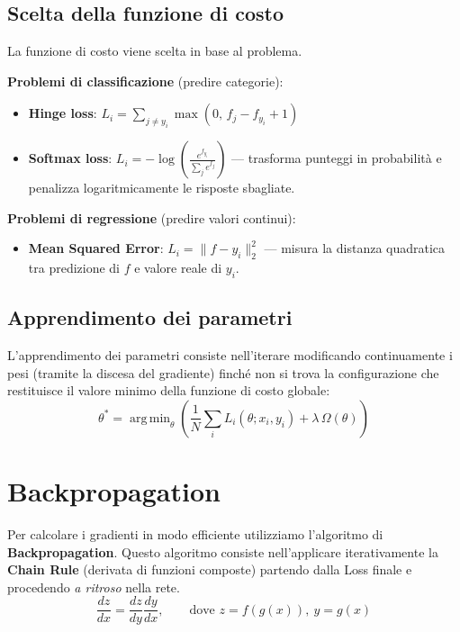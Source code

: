 \documentclass[11pt,a4paper]{article}
\DeclareMathOperator*{\argmin}{arg\,min}
\begin{document}
\subsection{Scelta della funzione di costo}
La funzione di costo viene scelta in base al problema.

\textbf{Problemi di classificazione} (predire categorie):
\begin{itemize}
  \item \textbf{Hinge loss}: $\displaystyle L_i = \sum_{j\neq y_i}\max(0,\, f_j - f_{y_i} + 1)$
  \item \textbf{Softmax loss}: $\displaystyle L_i = -\log\!\left(\frac{e^{f_{y_i}}}{\sum_j e^{f_j}}\right)$ \;— trasforma punteggi in probabilità e penalizza logaritmicamente le risposte sbagliate.
\end{itemize}

\textbf{Problemi di regressione} (predire valori continui):
\begin{itemize}
  \item \textbf{Mean Squared Error}: $L_i = \|f - y_i\|_2^2$ \;— misura la distanza quadratica tra predizione di $f$ e valore reale di $y_i$.
\end{itemize}

\subsection{Apprendimento dei parametri}
L'apprendimento dei parametri consiste nell'iterare modificando continuamente i pesi (tramite la discesa del gradiente) finché non si trova la configurazione che restituisce il valore minimo della funzione di costo globale:
\[
\theta^* = \argmin_\theta\left(\frac{1}{N}\sum_i L_i(\theta; x_i, y_i) + \lambda\,\Omega(\theta)\right)
\]

\section{Backpropagation}

Per calcolare i gradienti in modo efficiente utilizziamo l'algoritmo di \textbf{Backpropagation}. Questo algoritmo consiste nell'applicare iterativamente la \textbf{Chain Rule} (derivata di funzioni composte) partendo dalla Loss finale e procedendo \emph{a ritroso} nella rete.
\[
\frac{dz}{dx} = \frac{dz}{dy}\frac{dy}{dx}, \qquad \text{dove } z = f(g(x)),\ y = g(x)
\]
\end{document}
